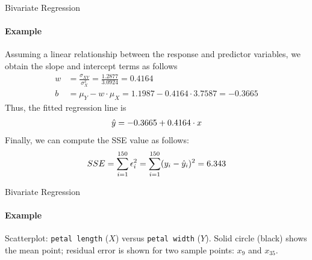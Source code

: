 \begin{frame}{Bivariate Regression}
\framesubtitle{Example}
    Assuming a linear relationship between the response and predictor
    variables, we %
    obtain the slope and intercept terms as follows
    \begin{align*}
        w & = \frac{\sigma_{XY}}{\sigma_X^2} = \frac{1.2877}{3.0924} =
        0.4164\\
        b & = \mu_Y - w \cdot \mu_X = 1.1987 - 0.4164 \cdot 3.7587 =
        -0.3665
    \end{align*}
    Thus, the fitted regression line is
    \begin{align*}
        \hat{y} = -0.3665 + 0.4164 \cdot x
    \end{align*}
%
    Finally, we can compute the SSE value 
as follows:
    \begin{align*}
        SSE = \sum_{i=1}^{150} \epsilon_i^2 
        = \sum_{i=1}^{150} (y_i - \hat{y}_i)^2
        = 6.343
    \end{align*}
%
\end{frame}

\begin{frame}{Bivariate Regression}
\framesubtitle{Example}

Scatterplot: {\tt petal length} ($X$) versus {\tt petal
width} ($Y$). Solid circle (black) shows the mean point; residual
error is shown for two sample points: $x_9$ and $x_{35}$.

\begin{center}
    \centering
{}
\end{center}
\end{frame}

